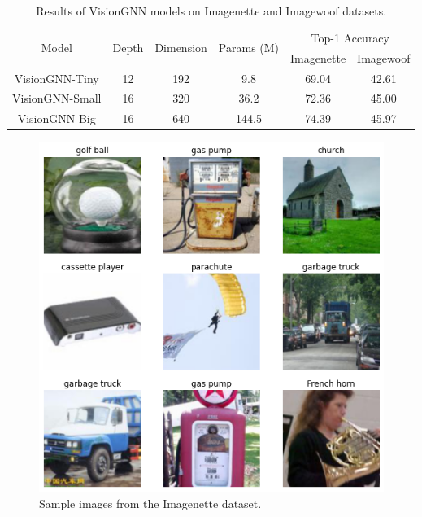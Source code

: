 \documentclass[sigconf, nonacm]{acmart}
\begin{document}
\begin{table}[t]
  \setlength{\tabcolsep}{12pt}
  \caption{Results of VisionGNN models on Imagenette and Imagewoof datasets.}
  \label{tab:results}
  \begin{tabular}{cccccc}
    \toprule
    \multirow{2}{*}{Model} & \multirow{2}{*}{Depth} & \multirow{2}{*}{Dimension} & \multirow{2}{*}{Params (M)} & \multicolumn{2}{c}{Top-1 Accuracy}             \\
                           &                        &                            &                             & Imagenette                         & Imagewoof \\
    \midrule
    VisionGNN-Tiny  & 12   & 192    & 9.8     & 69.04      & 42.61     \\
    VisionGNN-Small & 16   & 320    & 36.2    & 72.36      & 45.00     \\
    VisionGNN-Big   & 16   & 640    & 144.5   & 74.39      & 45.97     \\
    \bottomrule
  \end{tabular}
\end{table}


\begin{figure}[t]
  \centering
  \includegraphics[width=0.9\linewidth]{figures/imagenette.png}
  \caption{Sample images from the Imagenette dataset.}
  \label{fig:imagenette}
\end{figure}
\end{document}
